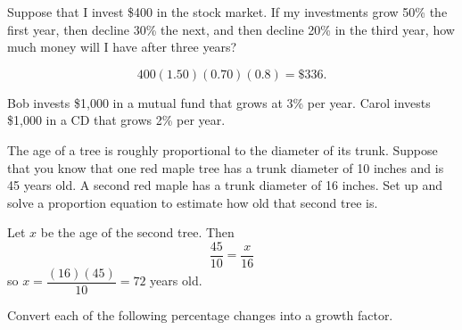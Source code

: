\documentclass[11pt,answers]{exam}
\begin{document}
\begin{questions}
\question Suppose that I invest \$400 in the stock market. If my investments grow 50\% the first year, then decline 30\% the next, and then decline 20\% in the third year, how much money will I have after three years?
\begin{solution}
$$400(1.50)(0.70)(0.8) = \$336.$$
\end{solution}
\vfill

\question Bob invests \$1,000 in a mutual fund that grows at 3\% per year.  Carol invests \$1,000 in a CD that grows 2\% per year.  
\vfill

\question The age of a tree is roughly proportional to the diameter of its trunk. Suppose that you know that one red maple tree has a trunk diameter of 10 inches and is 45 years old. A second red maple has a trunk diameter of 16 inches. Set up and solve a proportion equation to estimate how old that second tree is.
\begin{solution}
Let $x$ be the age of the second tree. Then
$$\dfrac{45}{10} = \dfrac{x}{16}$$
so $x = \dfrac{(16)(45)}{10} = 72$ years old.  
\end{solution}
\vfill

\newpage
\question Convert each of the following percentage changes into a growth factor. 
\end{questions}
\end{document}
